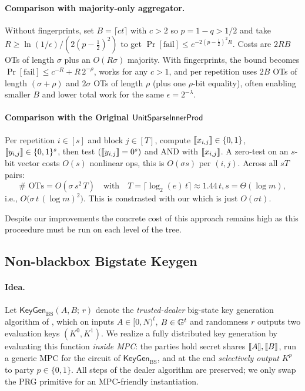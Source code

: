 \paragraph{Comparison with majority-only aggregator.}
Without fingerprints, set $B=\lceil c t\rceil$ with $c>2$ so $p=1-q>1/2$ and take
$R\ge \ln(1/\epsilon) / (2(p-\tfrac12)^2)$ to get $\Pr[\text{fail}]\le e^{-2(p-\frac12)^2R}$.
Costs are $2RB$ OTs of length $\sigma$ plus an $O(R\sigma)$ majority. With fingerprints, the bound becomes
$\Pr[\text{fail}]\le c^{-R}+R\,2^{-\rho}$, works for any $c>1$, and per repetition uses
$2B$ OTs of length $(\sigma{+}\rho)$ and $2\sigma$ OTs of length $\rho$ (plus one $\rho$-bit equality),
often enabling smaller $B$ and lower total work for the same $\epsilon=2^{-\lambda}$.




\paragraph{Comparison with the Original \texorpdfstring{$\mathsf{UnitSparseInnerProd}$}{SharedIPD}}
Per repetition \(i\in[s]\) and block \(j\in[T]\), compute \(\share{x_{i,j}}\in\{0,1\}\), \(\share{y_{i,j}}\in\{0,1\}^{s}\),
then test \((\share{y_{i,j}}=0^s)\) and AND with \(\share{x_{i,j}}\).
A zero-test on an \(s\)-bit vector costs \(O(s)\) nonlinear ops,
this is \(O(\sigma s)\) per \((i,j)\).
Across all \(sT\) pairs:
\[
{\#\text{ OTs} = O(\sigma\,s^2\,T)} \quad\text{with}\quad
T=\lceil \log_2(e)\,t\rceil\approx 1.44\,t,s=\Theta(\log m),
\]
i.e., \(O\big(\sigma\,t\,(\log m)^2\big)\). This is constrasted with our which is just $O(\sigma t)$.

Despite our improvements the concrete cost of this approach remains high as this proceedure must be run on each level of the tree. 





\subsection{Non-blackbox Bigstate Keygen}

\newcommand{\AMPRF}{\ensuremath{\mathsf{AMPRF}}}
\newcommand{\AMPRG}{\ensuremath{\mathsf{AMPRG}}}

\paragraph{Idea.}
Let $\mathsf{KeyGen}_{\mathrm{BS}}(A,B;\,r)$ denote the \emph{trusted-dealer} big-state key generation
algorithm of \cite{dmpf}, which on inputs $A\in[0,N)^t$, $B\in\mathbb{G}^t$ and randomness $r$ outputs two evaluation keys
$(K^0,K^1)$. We realize a fully distributed key generation by evaluating this function \emph{inside MPC}:
the parties hold secret shares $\share{A},\share{B}$, run a generic MPC for the circuit of $\mathsf{KeyGen}_{\mathrm{BS}}$,
and at the end \emph{selectively output} $K^p$ to party $p\in\{0,1\}$.
All steps of the dealer algorithm are preserved; we only swap the PRG primitive for an MPC-friendly instantiation.


